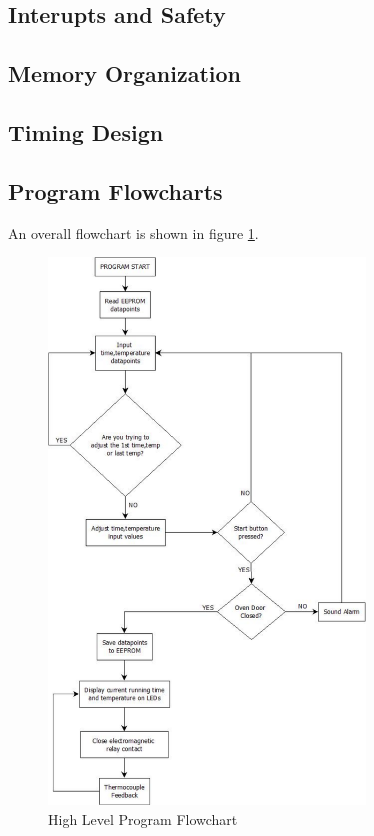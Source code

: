 \documentclass[10pt, twocolumn]{article}
\begin{document}
\subsection{Interupts and Safety}

\subsection{Memory Organization}

\subsection{Timing Design}

\subsection{Program Flowcharts}

An overall flowchart is shown in figure
\ref{high-level-program-flowchart}.

\begin{figure}
	\centering
	\includegraphics[width=0.75\textwidth]{high-level-program-flowchart.pdf}
	\caption{High Level Program Flowchart}
	\label{high-level-program-flowchart}
\end{figure}
\end{document}
